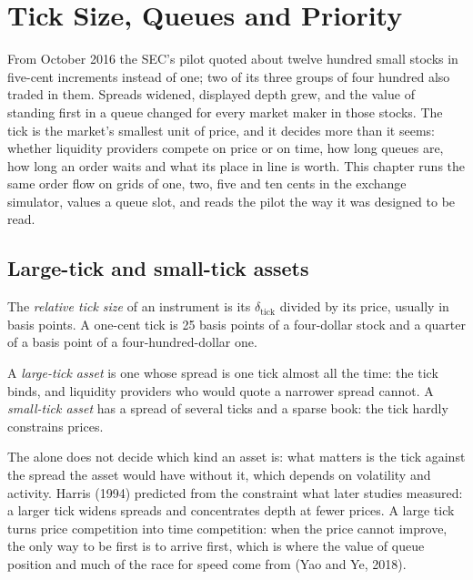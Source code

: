 \chapter{Tick Size, Queues and Priority}\label{ch:mx:tick-size-queues-and-priority}

From October 2016 the SEC's  pilot quoted about twelve hundred small stocks in five-cent increments instead of one; two of its three groups of
four hundred also traded in them. Spreads widened, displayed depth grew, and the value of standing first in a queue changed for every market maker in
those stocks. The tick is the market's smallest unit of price, and it decides more than it seems: whether liquidity providers compete on price or on
time, how long queues are, how long an order waits and what its place in line is worth. This chapter runs the same order flow on grids of one, two,
five and ten cents in the exchange simulator, values a queue slot, and reads the pilot the way it was designed to be read.

\section{Large-tick and small-tick assets}

\begin{definition}\label{def:mx:tick-size-queues-and-priority:relative}
The \emph{relative tick size} of an instrument is its  $\delta_{\mathrm{tick}}$ divided by its price, usually in basis points.
A one-cent tick is 25 basis points of a four-dollar stock and a quarter of a basis point of a four-hundred-dollar one.
\end{definition}

\begin{definition}\label{def:mx:tick-size-queues-and-priority:large}
A \emph{large-tick asset} is one whose spread is one tick almost all the time: the tick binds, and liquidity providers who would
quote a narrower spread cannot. A \emph{small-tick asset} has a spread of several ticks and a sparse book: the tick hardly
constrains prices.
\end{definition}

The  alone does not decide which kind an asset is: what matters is the tick against the spread the asset would have without it, which
depends on volatility and activity. Harris (1994) predicted from the constraint what later studies measured: a larger tick widens spreads and
concentrates depth at fewer prices. A large tick turns price competition into time competition: when the price cannot improve, the only way to be
first is to arrive first, which is where the value of queue position and much of the race for speed come from (Yao and Ye, 2018).

